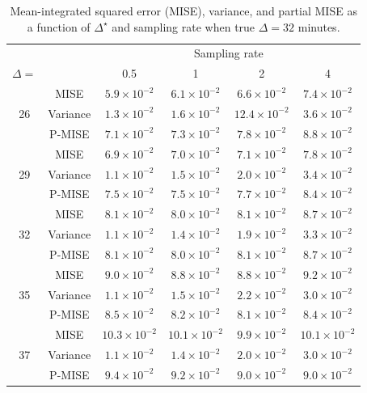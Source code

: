 \documentclass[12pt]{amsart}
\begin{document}
\begin{table}[!th]
\begin{tabular}{c | c c c c c}
& & \multicolumn{4}{c}{Sampling rate} \\ \cline{3-6}
$\Delta=$ & & 0.5 & 1 & 2 & 4 \\ \hline
\multirow{3}{*}{26} & MISE & $5.9 \times 10^{-2}$ & $6.1 \times 10^{-2}$ & $6.6 \times 10^{-2}$ & $7.4 \times 10^{-2}$ \\
 & Variance & $1.3 \times 10^{-2}$ & $1.6 \times 10^{-2}$ & $12.4 \times 10^{-2}$ & $3.6 \times 10^{-2}$ \\
  & P-MISE & $7.1 \times 10^{-2}$ & $7.3 \times 10^{-2}$ & $7.8 \times 10^{-2}$ & $8.8 \times 10^{-2}$ \\ \hline
\multirow{3}{*}{29} & MISE & $6.9 \times 10^{-2}$ & $7.0 \times 10^{-2}$ & $7.1 \times 10^{-2}$ & $7.8 \times 10^{-2}$ \\
 & Variance & $1.1 \times 10^{-2}$ & $1.5 \times 10^{-2}$ & $2.0 \times 10^{-2}$ & $3.4 \times 10^{-2}$ \\
  & P-MISE & $7.5 \times 10^{-2}$ & $7.5 \times 10^{-2}$ & $7.7 \times 10^{-2}$ & $8.4 \times 10^{-2}$ \\ \hline
\multirow{3}{*}{32} & MISE & $8.1 \times 10^{-2}$ & $8.0 \times 10^{-2}$ & $8.1 \times 10^{-2}$ & $8.7 \times 10^{-2}$ \\
 & Variance & $1.1 \times 10^{-2}$ & $1.4 \times 10^{-2}$ & $1.9 \times 10^{-2}$ & $3.3 \times 10^{-2}$ \\
  & P-MISE & $8.1 \times 10^{-2}$ & $8.0 \times 10^{-2}$ & $8.1 \times 10^{-2}$ & $8.7 \times 10^{-2}$ \\ \hline
\multirow{3}{*}{35} & MISE & $9.0 \times 10^{-2}$ & $8.8 \times 10^{-2}$ & $8.8 \times 10^{-2}$ & $9.2 \times 10^{-2}$ \\
 & Variance & $1.1 \times 10^{-2}$ & $1.5 \times 10^{-2}$ & $2.2 \times 10^{-2}$ & $3.0 \times 10^{-2}$ \\
  & P-MISE & $8.5 \times 10^{-2}$ & $8.2 \times 10^{-2}$ & $8.1 \times 10^{-2}$ & $8.4 \times 10^{-2}$ \\ \hline
\multirow{3}{*}{37} & MISE & $10.3 \times 10^{-2}$ & $10.1 \times 10^{-2}$ & $9.9 \times 10^{-2}$ & $10.1 \times 10^{-2}$ \\
 & Variance & $1.1 \times 10^{-2}$ & $1.4 \times 10^{-2}$ & $2.0 \times 10^{-2}$ & $3.0 \times 10^{-2}$ \\
  & P-MISE & $9.4 \times 10^{-2}$ & $9.2 \times 10^{-2}$ & $9.0 \times 10^{-2}$ & $9.0 \times 10^{-2}$ \\ \hline
\end{tabular}
\caption{Mean-integrated squared error (MISE), variance, and partial MISE as a function of $\Delta^\star$ and sampling rate when true $\Delta = 32$ minutes.}
\label{tab:appmise}
\end{table}
\end{document}
